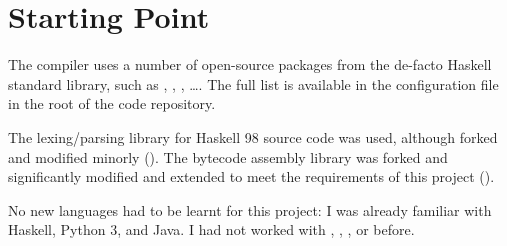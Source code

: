 \documentclass[dissertation.tex]{subfiles}
\begin{document}
\section{Starting Point}\label{sec:starting-point}
{
    The compiler uses a number of open-source packages from the de-facto Haskell standard library, such as , , , \dots. The full list is available in the  configuration file in the root of the code repository.

    The  lexing/parsing library for Haskell 98 source code was used, although forked and modified minorly (). The bytecode assembly library  was forked and significantly modified and extended to meet the requirements of this project ().

    No new languages had to be learnt for this project: I was already familiar with Haskell, Python 3, and Java. I had not worked with , , , or  before. 
}
\end{document}
